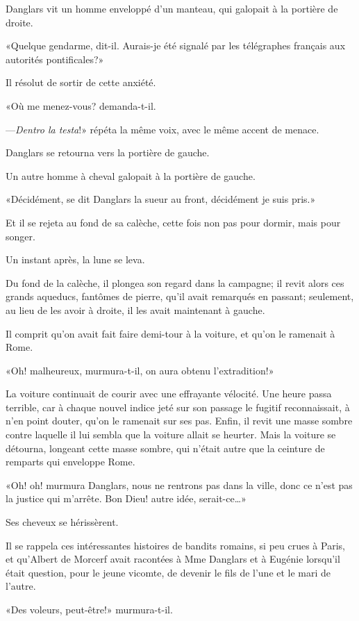 Danglars vit un homme enveloppé d'un manteau, qui galopait à la portière de droite. 

«Quelque gendarme, dit-il. Aurais-je été signalé par les télégraphes français aux autorités pontificales?» 

Il résolut de sortir de cette anxiété. 

«Où me menez-vous? demanda-t-il. 

—\textit{Dentro la testa}!» répéta la même voix, avec le même accent de menace. 

Danglars se retourna vers la portière de gauche. 

Un autre homme à cheval galopait à la portière de gauche. 

«Décidément, se dit Danglars la sueur au front, décidément je suis pris.» 

Et il se rejeta au fond de sa calèche, cette fois non pas pour dormir, mais pour songer. 

Un instant après, la lune se leva. 

Du fond de la calèche, il plongea son regard dans la campagne; il revit alors ces grands aqueducs, fantômes de pierre, qu'il avait remarqués en passant; seulement, au lieu de les avoir à droite, il les avait maintenant à gauche. 

Il comprit qu'on avait fait faire demi-tour à la voiture, et qu'on le ramenait à Rome. 

«Oh! malheureux, murmura-t-il, on aura obtenu l'extradition!» 

La voiture continuait de courir avec une effrayante vélocité. Une heure passa terrible, car à chaque nouvel indice jeté sur son passage le fugitif reconnaissait, à n'en point douter, qu'on le ramenait sur ses pas. Enfin, il revit une masse sombre contre laquelle il lui sembla que la voiture allait se heurter. Mais la voiture se détourna, longeant cette masse sombre, qui n'était autre que la ceinture de remparts qui enveloppe Rome. 

«Oh! oh! murmura Danglars, nous ne rentrons pas dans la ville, donc ce n'est pas la justice qui m'arrête. Bon Dieu! autre idée, serait-ce\dots» 

Ses cheveux se hérissèrent. 

Il se rappela ces intéressantes histoires de bandits romains, si peu crues à Paris, et qu'Albert de Morcerf avait racontées à Mme Danglars et à Eugénie lorsqu'il était question, pour le jeune vicomte, de devenir le fils de l'une et le mari de l'autre. 

«Des voleurs, peut-être!» murmura-t-il. 

